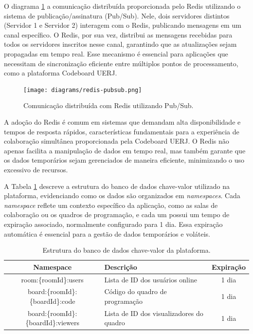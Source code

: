 O diagrama \ref{fig:redis-pubsub} a comunicação distribuída proporcionada pelo Redis utilizando o sistema de publicação/assinatura (Pub/Sub). Nele, dois servidores distintos (Servidor 1 e Servidor 2) interagem com o Redis, publicando mensagens em um canal específico. O Redis, por sua vez, distribui as mensagens recebidas para todos os servidores inscritos nesse canal, garantindo que as atualizações sejam propagadas em tempo real. Esse mecanismo é essencial para aplicações que necessitam de sincronização eficiente entre múltiplos pontos de processamento, como a plataforma Codeboard UERJ.

\begin{figure}[H]
    \centering
    \caption{Comunicação distribuída com Redis utilizando Pub/Sub.}
    \label{fig:redis-pubsub}
    \texttt{[image: diagrams/redis-pubsub.png]}
\end{figure}


A adoção do Redis é comum em sistemas que demandam alta disponibilidade e tempos de resposta rápidos, características fundamentais para a experiência de colaboração simultânea proporcionada pela Codeboard UERJ. O Redis não apenas facilita a manipulação de dados em tempo real, mas também garante que os dados temporários sejam gerenciados de maneira eficiente, minimizando o uso excessivo de recursos.

A Tabela \ref{tab:key-value-database} descreve a estrutura do banco de dados chave-valor utilizado na plataforma, evidenciando como os dados são organizados em \emph{namespaces}. Cada \emph{namespace} reflete um contexto específico da aplicação, como as salas de colaboração ou os quadros de programação, e cada um possui um tempo de expiração associado, normalmente configurado para 1 dia. Essa expiração automática é essencial para a gestão de dados temporários e voláteis.

\begin{table}[H]
    \centering
    \caption{Estrutura do banco de dados chave-valor da plataforma.}
    \label{tab:key-value-database}
    \renewcommand{\arraystretch}{1.3} 
    \begin{tabular}{|c|p{6cm}|c|}
        \hline
        \textbf{Namespace}                   & \textbf{Descrição}                       & \textbf{Expiração} \\
        \hline
        room:\{roomId\}:users                & Lista de ID dos usuários online          & 1 dia              \\
        \hline
        board:\{roomId\}:\{boardId\}:code    & Código do quadro de programação          & 1 dia              \\
        \hline
        board:\{roomId\}:\{boardId\}:viewers & Lista de ID dos visualizadores do quadro & 1 dia              \\ 
        
        \hline
    \end{tabular}
\end{table}

